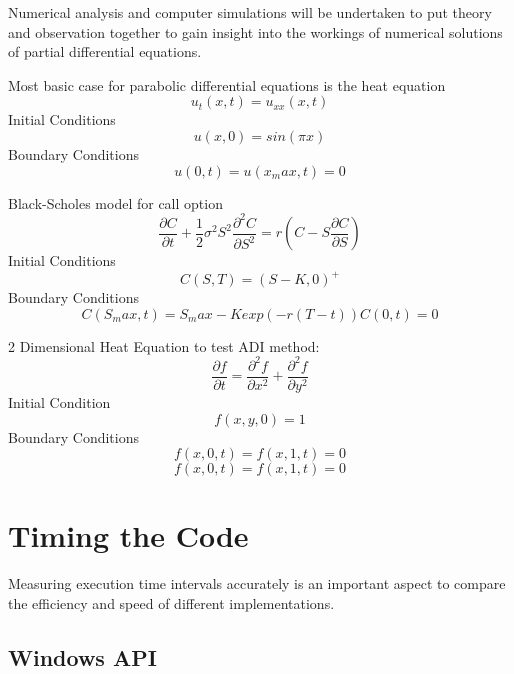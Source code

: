 \documentclass[12pt, oneside]{book}
\theoremstyle{plain}
\theoremstyle{definition}
\begin{document}
Numerical analysis and computer simulations will be undertaken to put theory and observation together to gain insight into the workings of numerical solutions of partial differential equations.

Most basic case for parabolic differential equations is the heat equation
\begin{equation}
u_t(x,t)=u_{xx}(x, t)
\end{equation}
Initial Conditions
\begin{equation}
u(x, 0) = sin(\pi x)
\end{equation}
Boundary Conditions
\begin{equation}
u(0, t) = u(x_max, t) = 0
\end{equation}

Black-Scholes model for call option
\begin{equation}
\frac{\partial C}{\partial t} + \frac{1}{2}\sigma^2 S^2 \frac{\partial^2 C}{\partial S^2} = r(C - S \frac{\partial C}{\partial S})
\end{equation}
Initial Conditions
\begin{equation}
C(S, T) = (S - K, 0)^+
\end{equation}
Boundary Conditions
\begin{equation}
C(S_max, t) = S_max - K exp(-r(T-t))
C(0, t) = 0
\end{equation}

2 Dimensional Heat Equation to test ADI method:
\begin{equation}
\frac{\partial f}{\partial t} = \frac{\partial^2 f}{\partial x^2} +\frac{\partial^2 f}{\partial y^2}
\end{equation}
Initial Condition
\begin{equation}
f(x,y,0) = 1
\end{equation}
Boundary Conditions
\begin{equation}
f(x, 0, t) = f(x, 1, t) = 0
\end{equation}
\begin{equation}
f(x, 0, t) = f(x, 1, t) = 0
\end{equation}

\section{Timing the Code}
Measuring execution time intervals accurately is an important aspect to compare the efficiency and speed of different implementations.

\subsection{Windows API}
\end{document}
